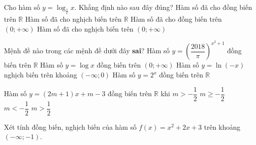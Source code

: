 \begin{ex}%
	Cho hàm số $y=\log_{\tfrac{1}{\mathrm{e}}} x$.  Khẳng định nào sau đây đúng?
	 \choice
		{Hàm số đã cho đồng  biến trên $\mathbb{R}$}
		{Hàm số  đã cho nghịch biến trên $\mathbb{R}$}
		{Hàm số đã cho đồng biến  trên $(0;+\infty)$}
		{\True  Hàm số đã cho nghịch biến trên $(0;+\infty)$}
\end{ex}

\begin{ex}%
	Mệnh đề nào trong các mệnh đề dưới đây  \textbf{sai}?
	\choice 
		{Hàm số $ y={{\left(\dfrac{2018}{\pi } \right)}^{{x^2}+1}}$ đồng  biến trên $\mathbb{R}$}
		{Hàm số $ y=\log x$ đồng biến  trên $( 0;+\infty)$}
		{\True Hàm  số $ y=\ln( -x)$ nghịch biến trên khoảng $( -\infty;0)$}
		{Hàm số $ y={2^x}$ đồng biến trên  $\mathbb{R}$}
\end{ex}

\begin{ex}%
	Hàm số $y=(2m+1)x+m-3$ đồng biến  trên $\mathbb{R}$ khi
	\choice 
		{\True  $m >-\dfrac{1}{2}$}
		{$m\ge-\dfrac{1}{2}$} 
		{$m  <-\dfrac{1}{2}$}
		{$m  >\dfrac{1}{2}$}
\end{ex}

\begin{bt}%
	Xét tính đồng biến, nghịch biến của hàm số $f(x)=x^2+2x+3$ trên khoảng $\left(-\infty;-1\right)$.
\end{bt}

